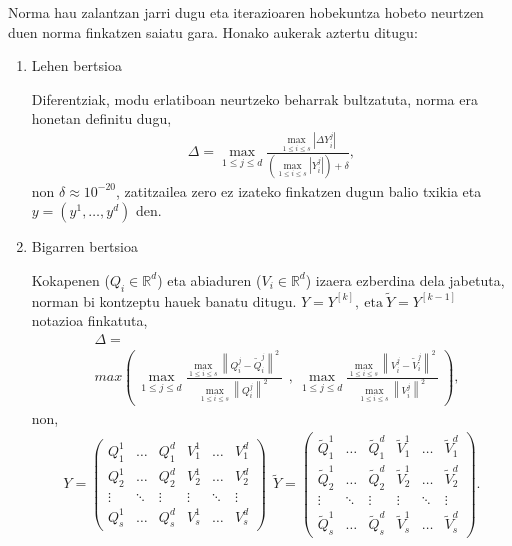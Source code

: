 Norma hau zalantzan jarri dugu eta iterazioaren hobekuntza hobeto neurtzen duen norma finkatzen saiatu gara. Honako aukerak aztertu ditugu:
\begin{enumerate}
\item Lehen bertsioa

Diferentziak, modu erlatiboan neurtzeko beharrak bultzatuta, norma era honetan definitu dugu,
\begin{align*}
\Delta=\max_{1 \leqslant j \leqslant d} \frac{\max_{1 \leqslant i \leqslant s} |\Delta Y_i^j|}
                                                {(\max_{1 \leqslant i \leqslant s}|Y_i^j|)+\delta},
\end{align*}
non $\delta \approx 10^{-20}$, zatitzailea zero ez izateko finkatzen dugun balio txikia  eta $y=(y^1,\dots,y^d)$ den.

\item Bigarren bertsioa

Kokapenen ($Q_i \in \mathbb{R}^d$) eta abiaduren ($V_i \in \mathbb{R}^d$) izaera ezberdina dela jabetuta, norman bi kontzeptu hauek banatu ditugu. $Y=Y^{[k]}, \ \text{eta} \ \tilde Y=Y^{[k-1]}$ notazioa finkatuta,
\begin{align*}
 & \Delta =\\
 & max\left({\  {\max_{1\le j\le d} \frac{{\max_{1\le i\le s} {\left\|Q^{j}_i-{\tilde{Q}}^{j}_i\right\|}^2\ }}{{\max_{1\le i\le s} {\left\|Q^{j}_i\right\|}^2\ }}\ }\ },\ {\max_{1\le j\le d} \frac{{\max_{1\le i\le s} {\left\|V^{j}_i-{\tilde{V}}^{j}_i\right\|}^2\ }}{{\max_{1\le i\le s} {\left\|V^{j}_i\right\|}^2\ }}\ }\right),
\end{align*}
non, 
\begin{align*}
Y=\left( \begin{array}{cccccc}
Q^{1}_1 & \dots  & Q^{d}_1 & V^{1}_1 & \dots  & V^{d}_1 \\ 
Q^{1}_2 & \dots  & Q^{d}_2 & V^{1}_2 & \dots  & V^{d}_2 \\ 
\vdots  & \ddots  & \vdots  & \vdots  & \ddots  & \vdots  \\ 
Q^{1}_s & \dots  & Q^{d}_s & V^{1}_s & \dots  & V^{d}_s \end{array}
\right)\ \  
\tilde Y=\left( \begin{array}{cccccc}
\tilde Q^{1}_1 & \dots  & \tilde Q^{d}_1 & \tilde V^{1}_1 & \dots  & \tilde V^{d}_1 \\ 
\tilde Q^{1}_2 & \dots  & \tilde Q^{d}_2 & \tilde V^{1}_2 & \dots  & \tilde V^{d}_2 \\ 
\vdots  & \ddots  & \vdots  & \vdots  & \ddots  & \vdots  \\ 
\tilde Q^{1}_s & \dots  & \tilde Q^{d}_s & \tilde V^{1}_s & \dots  & \tilde V^{d}_s \end{array}
\right). 
\end{align*}


\end{enumerate}
